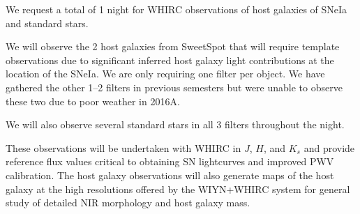 \documentclass[11pt]{article}
\begin{document}
\clearpage


%

%

\expdesign

We request a total of 1 night for WHIRC observations of host galaxies of SNeIa and standard stars.  

We will observe the 2 host galaxies from SweetSpot that will
require template observations due to significant inferred host galaxy light contributions at the location of the SNeIa.
We are only requiring one filter per object. 
We have gathered the other 1--2 filters in previous semesters but were unable to observe these two due to poor weather in 2016A. 

We will also observe several standard stars in all 3 filters throughout the night.

These observations will be undertaken with WHIRC in $J$, $H$, and $K_s$
and provide reference flux values critical to obtaining
SN lightcurves and improved PWV calibration.  
The host galaxy observations will also generate
maps of the host galaxy at the high resolutions offered by the WIYN+WHIRC system for general study of detailed NIR morphology and host galaxy mass.

% 

\end{document}
